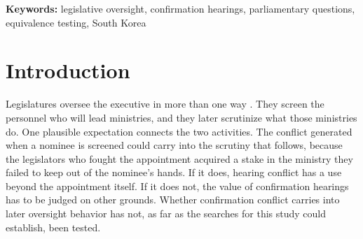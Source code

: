 \documentclass[11pt]{article}
\begin{document}
\begin{abstract}
\noindent Legislators who publicly oppose a ministerial nominee at a confirmation hearing might be expected to scrutinize that ministry more intensively afterward. Position-taking accounts of legislative oversight predict such carry-over, and accounts of confirmation hearings as party theater predict none. I test the two predictions with a difference-in-differences design on committee transcripts of the Korean National Assembly. The analysis follows 191 legislators in 278 legislator-ministry pairs who questioned ministerial nominees in 2020 to 2021 or in 2023, with opposition coded by rule from each legislator's party relative to the nominating president. Opposing a nominee is not associated with a rise in the confirmed ministry's share of a legislator's questions at the following annual state audit. The estimate is statistically equivalent to zero within the five-point threshold set before estimation, and the placebo estimate for other agencies is also close to zero. An apparent baseline attention gap dissolves under committee fixed effects. A within-opposition intensity slope is positive but imprecise, and its interval includes both zero and the bar set for a diluted effect. A separate cohort whose audits spanned a change of government shows the same null. Confirmation conflict and audit allocation appear to be separate institutional routines rather than links in a causal chain.
\end{abstract}

\bigskip
\noindent\textbf{Keywords:} legislative oversight, confirmation hearings, parliamentary questions, equivalence testing, South Korea

\clearpage
{}

\section{Introduction}

Legislatures oversee the executive in more than one way \citep{mccubbins1984}. They screen the personnel who will lead ministries, and they later scrutinize what those ministries do. One plausible expectation connects the two activities. The conflict generated when a nominee is screened could carry into the scrutiny that follows, because the legislators who fought the appointment acquired a stake in the ministry they failed to keep out of the nominee's hands. If it does, hearing conflict has a use beyond the appointment itself. If it does not, the value of confirmation hearings has to be judged on other grounds. Whether confirmation conflict carries into later oversight behavior has not, as far as the searches for this study could establish, been tested.
\end{document}
